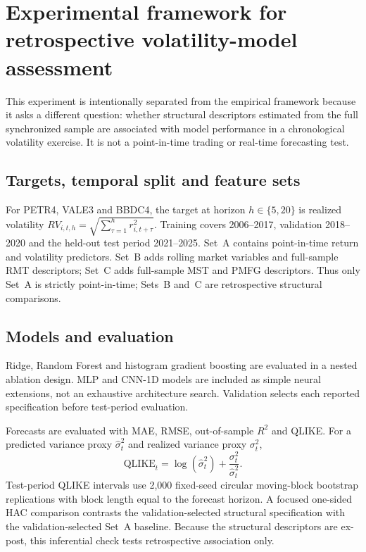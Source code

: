 \section{Experimental framework for retrospective volatility-model assessment}
\label{sec:experimental_framework}

This experiment is intentionally separated from the empirical framework because it asks a different question: whether structural descriptors estimated from the full synchronized sample are associated with model performance in a chronological volatility exercise. It is not a point-in-time trading or real-time forecasting test.

\subsection{Targets, temporal split and feature sets}
\label{subsec:forecasting_method}

For PETR4, VALE3 and BBDC4, the target at horizon $h\in\{5,20\}$ is realized volatility $RV_{i,t,h}=\sqrt{\sum_{\tau=1}^{h}r_{i,t+\tau}^{2}}$. Training covers 2006--2017, validation 2018--2020 and the held-out test period 2021--2025. Set~A contains point-in-time return and volatility predictors. Set~B adds rolling market variables and full-sample RMT descriptors; Set~C adds full-sample MST and PMFG descriptors. Thus only Set~A is strictly point-in-time; Sets~B and~C are retrospective structural comparisons.

\subsection{Models and evaluation}
\label{subsec:forecast_models_method}

Ridge, Random Forest and histogram gradient boosting are evaluated in a nested ablation design. MLP and CNN-1D models are included as simple neural extensions, not an exhaustive architecture search. Validation selects each reported specification before test-period evaluation.

\label{subsec:evaluation_method}
Forecasts are evaluated with MAE, RMSE, out-of-sample $R^2$ and QLIKE. For a predicted variance proxy $\hat{\sigma}_t^2$ and realized variance proxy $\sigma_t^2$,
\begin{equation}
\mathrm{QLIKE}_t=\log(\hat{\sigma}_t^2)+\frac{\sigma_t^2}{\hat{\sigma}_t^2}.
\end{equation}
Test-period QLIKE intervals use 2,000 fixed-seed circular moving-block bootstrap replications with block length equal to the forecast horizon. A focused one-sided HAC comparison contrasts the validation-selected structural specification with the validation-selected Set~A baseline. Because the structural descriptors are ex-post, this inferential check tests retrospective association only.
